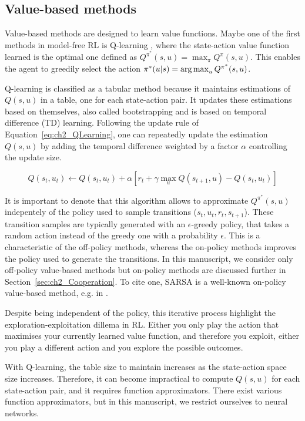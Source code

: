 \subsection{Value-based methods} \label{sec:ch2_value_based_methods}
Value-based methods are designed to learn value functions.
Maybe one of the first methods in model-free RL is Q-learning \citep{watkins1992q}, where the state-action value function learned is the optimal one defined as $Q^{\pi^*}(s, u)=\max_{\pi}Q^\pi(s, u)$.
This enables the agent to greedily select the action $\pi^*(u|s)=\operatorname*{arg\,max}_u Q^{\pi^*}(s, u)$.

Q-learning is classified as a tabular method because it maintains estimations of $Q(s, u)$ in a table, one for each state-action pair.
It updates these estimations based on themselves, also called bootstrapping and is based on temporal difference (TD) learning.
Following the update rule of Equation~\ref{eq:ch2_QLearning}, one can repeatedly update the estimation $Q(s, u)$ by adding the temporal difference weighted by a factor $\alpha$ controlling the update size.

\begin{equation}
\label{eq:ch2_QLearning}
    Q(s_t, u_t) \leftarrow Q(s_t, u_t) + \alpha \left[ r_t + \gamma \max_u Q(s_{t+1}, u) - Q(s_t, u_t) \right]
\end{equation}

It is important to denote that this algorithm allows to approximate $Q^{\pi^*}(s, u)$ indepentely of the policy used to sample transitions ($s_t, u_t, r_t, s_{t+1}$).
These transition samples are typically generated with an $\epsilon$-greedy policy, that takes a random action instead of the greedy one with a probability $\epsilon$.
This is a characteristic of the off-policy methods, whereas the on-policy methods improves the policy used to generate the transitions.
In this manuscript, we consider only off-policy value-based methods but on-policy methods are discussed further in Section~\ref{sec:ch2_Cooperation}.
To cite one, SARSA is a well-known on-policy value-based method, e.g. in \citep{sutton2018reinforcement}.

Despite being independent of the policy, this iterative process highlight the exploration-exploitation dillema in RL.
Either you only play the action that maximises your currently learned value function, and therefore you exploit, either you play a different action and you explore the possible outcomes.

With Q-learning, the table size to maintain increases as the state-action space size increases.
Therefore, it can become impractical to compute $Q(s, u)$ for each state-action pair, and it requires function approximators.
There exist various function approximators, but in this manuscript, we restrict ourselves to neural networks.

